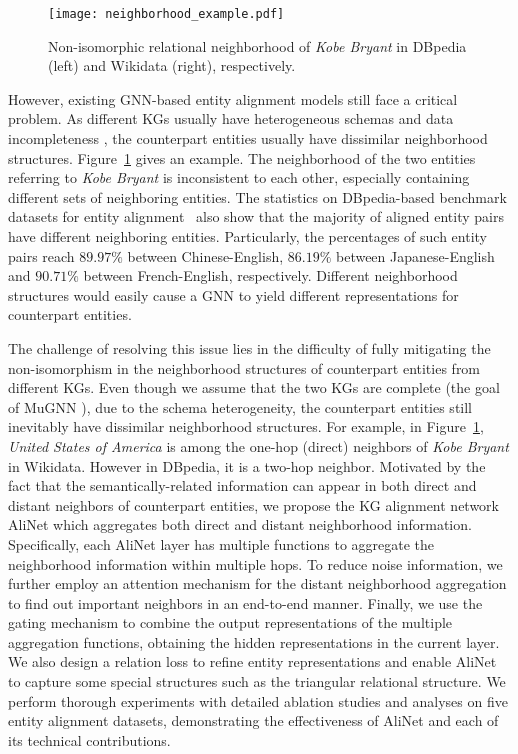 \documentclass[letterpaper]{article} \usepackage{aaai20}  \usepackage{times}  \usepackage{helvet} \usepackage{courier}  \usepackage[hyphens]{url}  \usepackage{graphicx} \urlstyle{rm} \def\UrlFont{\rm}  \frenchspacing  \setlength{\pdfpagewidth}{8.5in}  \setlength{\pdfpageheight}{11in}  \usepackage{amsmath}
\begin{document}
\begin{figure}[!t]
	\center
	\texttt{[image: neighborhood\_example.pdf]}
	\caption{Non-isomorphic relational neighborhood of \textit{Kobe Bryant} in DBpedia (left) and Wikidata (right), respectively.}
	\label{fig:example}
\end{figure}

However, existing GNN-based entity alignment models still face a critical problem. As different KGs usually have heterogeneous schemas and data incompleteness \cite{KGIdentification}, the counterpart entities usually have dissimilar neighborhood structures. Figure~\ref{fig:example} gives an example. The neighborhood of the two entities referring to \textit{Kobe Bryant} is inconsistent to each other, especially containing different sets of neighboring entities. The statistics on DBpedia-based benchmark datasets for entity alignment~\cite{JAPE} also show that the majority of aligned entity pairs have different neighboring entities. Particularly, the percentages of such entity pairs reach $89.97\%$ between Chinese-English, $86.19\%$ between Japanese-English and $90.71\%$ between French-English, respectively. Different neighborhood structures would easily cause a GNN to yield different representations for counterpart entities. 

The challenge of resolving this issue lies in the difficulty of fully mitigating the non-isomorphism in the neighborhood structures of counterpart entities from different KGs. Even though we assume that the two KGs are complete (the goal of MuGNN \cite{MuGNN}), due to the schema heterogeneity, the counterpart entities still inevitably have dissimilar neighborhood structures. For example, in Figure~\ref{fig:example}, \textit{United States of America} is among the one-hop (direct) neighbors of \textit{Kobe Bryant} in Wikidata. However in DBpedia, it is a two-hop neighbor. Motivated by the fact that the semantically-related information can appear in both direct and distant neighbors of counterpart entities, we propose the KG alignment network AliNet which aggregates both direct and distant neighborhood information. Specifically, each AliNet layer has multiple functions to aggregate the neighborhood information within multiple hops. To reduce noise information, we further employ an attention mechanism for the distant neighborhood aggregation to find out important neighbors in an end-to-end manner. Finally, we use the gating mechanism to combine the output representations of the multiple aggregation functions, obtaining the hidden representations in the current layer. We also design a relation loss to refine entity representations and enable AliNet to capture some special structures such as the triangular relational structure. We perform thorough experiments with detailed ablation studies and analyses on five entity alignment datasets, demonstrating the effectiveness of AliNet and each of its technical contributions.
\end{document}
